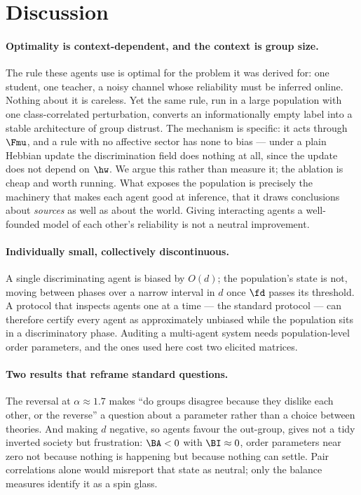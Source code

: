 \section{Discussion}
\label{sec:discussion}

\paragraph{Optimality is context-dependent, and the context is group size.} The rule
these agents use is optimal for the problem it was derived for: one student, one
teacher, a noisy channel whose reliability must be inferred online. Nothing about it
is careless. Yet the same rule, run in a large population with one class-correlated
perturbation, converts an informationally empty label into a stable architecture of
group distrust. The mechanism is specific: it acts through $\Fmu$, and a rule with no
affective sector has none to bias --- under a plain Hebbian update the discrimination
field does nothing at all, since the update does not depend on $\hw$. We argue this
rather than measure it; the ablation is cheap and worth running. What exposes the
population is precisely the machinery that makes each agent good at inference, that
it draws conclusions about \emph{sources} as well as about the world. Giving
interacting agents a well-founded model of each other's reliability is not a neutral
improvement.

\paragraph{Individually small, collectively discontinuous.} A single discriminating
agent is biased by $O(d)$; the population's state is not, moving between phases over
a narrow interval in $d$ once $\fd$ passes its threshold. A protocol that inspects
agents one at a time --- the standard protocol --- can therefore certify every agent
as approximately unbiased while the population sits in a discriminatory phase.
Auditing a multi-agent system needs population-level order parameters, and the ones
used here cost two elicited matrices.

\paragraph{Two results that reframe standard questions.} The reversal at
$\alpha\approx1.7$ makes ``do groups disagree because they dislike each other, or the
reverse'' a question about a parameter rather than a choice between theories. And
making $d$ negative, so agents favour the out-group, gives not a tidy inverted
society but frustration:
$\BA<0$ with $\BI\approx0$, order parameters near zero not because nothing is
happening but because nothing can settle. Pair correlations alone would misreport
that state as neutral; only the balance measures identify it as a spin glass.

